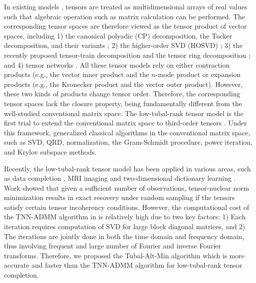 \documentclass[format=acmsmall, review=false, screen=true]{acmart}
\begin{document}
In existing models \cite{kolda2009tensor} \cite{papalexakis2016tensors} \cite{oseledets2011tensor} \cite{cichocki2015tensor}, tensors are treated as multidimensional arrays of real values such that algebraic operation such as matrix calculation can be performed. The corresponding tensor spaces are therefore viewed as the tensor product of vector spaces, including 1) the canonical polyadic (CP) decomposition, the Tucker decomposition, and their variants \cite{kolda2009tensor}; 2) the higher-order SVD (HOSVD) \cite{de2000multilinhttps://v2.overleaf.com/project/5aeeaf60bf83460d0d26fcd9ear}; 3) the recently proposed tensor-train decomposition \cite{oseledets2011tensor} and the tensor ring decomposition \cite{zhao2016tensor}; and 4) tensor networks \cite{cichocki2016tensor}. All these tensor models rely on either contraction products (e.g., the vector inner product and the $n$-mode product \cite{kolda2009tensor} or expansion products (e.g., the Kronecker product and the vector outer product). However, these two kinds of products change tensor order. Therefore, the corresponding tensor spaces lack the closure property, being fundamentally different from the well-studied conventional matrix space. The low-tubal-rank tensor model \cite{kilmer2011factorization} \cite{kilmer2013third} is the first trial to extend the conventional matrix space to third-order tensors \cite{braman2010third}. Under this framework, \cite{kilmer2011factorization} \cite{kilmer2013third} generalized classical algorithms in the conventional matrix space, such as SVD, QRD, normalization, the Gram-Schmidt procedure, power iteration, and Krylov subspace methods.

Recently, the low-tubal-rank tensor model has been applied in various areas, such as data completion \cite{zhang2017exact} \cite{XiaoYang2016Low}, MRI imaging \cite{semerci2014tensor} and two-dimensional dictionary learning \cite {jiang2017graph}. Work \cite{zhang2017exact} \cite{zhang2014novel} showed that given a sufficient number of observations, tensor-nuclear norm minimization results in exact recovery under random sampling if the tensors satisfy certain tensor incoherency conditions.
However, the computational cost of the TNN-ADMM algorithm in \cite{zhang2017exact} is relatively high due to two key factors: 1) Each iteration requires computation of SVD for large block diagonal matrices, and 2) The iterations are jointly done in both the time domain and frequency domain, thus involving frequent and large number of Fourier and inverse Fourier transforms. Therefore, we proposed the Tubal-Alt-Min algorithm \cite{XiaoYang2016Low} which is more accurate and
faster than the TNN-ADMM algorithm for low-tubal-rank tensor completion.
\end{document}
